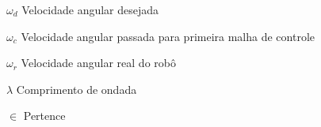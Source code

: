 %
%

\begin{simbolos}
    \item[$ \omega _{d} $] Velocidade angular desejada
    \item[$ \omega _{c} $] Velocidade angular passada para primeira malha de controle
    \item[$ \omega _{r} $] Velocidade angular real do robô
    \item[$ \lambda $] Comprimento de ondada
    \item[$ \in $] Pertence
\end{simbolos}
